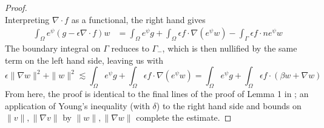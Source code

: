 \documentclass[11pt,onecolumn]{scrartcl}
\newcommand{\grad}{\nabla}
\renewcommand{\div}{\grad \cdot}
\begin{document}
\begin{proof}
\[\]
Interpreting $\div f$ as a functional, the right hand gives
\begin{align*}
\int_\Omega e^\psi (g-\epsilon \div f) w &= \int_\Omega e^\psi g + \int_\Omega \epsilon f \cdot \grad (e^\psi w) - \int_\Gamma \epsilon f\cdot n e^\psi w
\end{align*}
The boundary integral on $\Gamma$ reduces to $\Gamma_-$, which is then nullified by the same term on the left hand side, leaving us with 
\[
\epsilon \|\grad w\|^2 + \|w\|^2 \lesssim \int_\Omega e^\psi g + \int_\Omega \epsilon f \cdot \grad (e^\psi w) = \int_\Omega e^\psi g + \int_\Omega \epsilon f \cdot (\beta w + \grad w)
\]
From here, the proof is identical to the final lines of the proof of Lemma 1 in \cite{DPGrobustness}; an application of Young's inequality (with $\delta$) to the right hand side and bounds on $\|v\|, \|\grad v\|$ by $\|w\|,\|\grad w\|$ complete the estimate.  
\end{proof}
\end{document}
